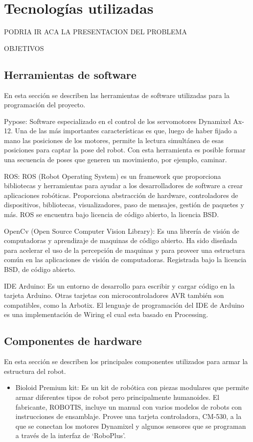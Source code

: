 \chapter{Tecnologías utilizadas}\label{chapter:presentacion_del_problema}

 PODRIA IR ACA LA PRESENTACION DEL PROBLEMA
 
 OBJETIVOS
 
\section{ Herramientas de software}
En esta sección se describen las herramientas de software utilizadas para la programación del proyecto.

Pypose: Software especializado en el control de los servomotores Dynamixel Ax-12. Una de las más importantes características es que, luego de haber fijado a mano las posiciones de los motores, permite la lectura simultánea de esas posiciones para captar la pose del robot. Con esta herramienta es posible formar una secuencia de poses que generen un movimiento, por ejemplo, caminar. \cite{pypose}

ROS: ROS (Robot Operating System) es un framework que proporciona bibliotecas y herramientas para ayudar a los desarrolladores de software a crear aplicaciones robóticas. Proporciona abstracción de hardware, controladores de dispositivos, bibliotecas, visualizadores, paso de mensajes, gestión de paquetes y más. ROS se encuentra bajo licencia de código abierto, la licencia BSD.

OpenCv (Open Source Computer Vision Library): Es una librería de visión de computadoras y aprendizaje de maquinas de código abierto. Ha sido diseñada para acelerar el uso de la percepción de maquinas y para proveer una estructura común en las aplicaciones de visión de computadoras. Registrada bajo la licencia BSD, de código abierto. \cite{opencv}

IDE Arduino: Es un entorno de desarrollo para escribir y cargar código en la tarjeta Arduino. Otras tarjetas con microcontroladores AVR también son compatibles, como la Arbotix. El lenguaje de programación del IDE de Arduino es una implementación de Wiring el cual esta basado en Processing.  \cite{arduino}


\section{Componentes de hardware}
En esta sección se describen los principales componentes utilizados para armar la estructura del robot.
\begin{itemize}
\item Bioloid Premium kit: Es un kit de robótica con piezas modulares que permite armar diferentes tipos de robot pero principalmente humanoides. El fabricante, ROBOTIS, incluye un manual con varios modelos de robots con instrucciones de ensamblaje. Provee una tarjeta controladora, CM-530, a la que se conectan los motores Dynamixel y algunos sensores que se programan a través de la interfaz de ‘RoboPlus’.

\end{itemize}

